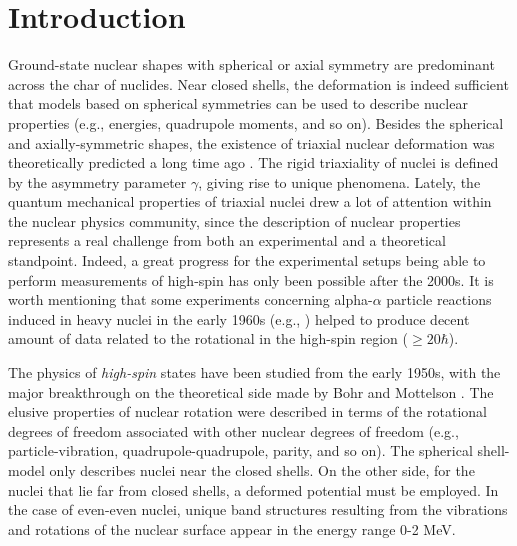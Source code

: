 \chapter{Introduction}

Ground-state nuclear shapes with spherical or axial symmetry are predominant across the char of nuclides. Near closed shells, the deformation is indeed sufficient that models based on spherical symmetries can be used to describe nuclear properties (e.g., energies, quadrupole moments, and so on). Besides the spherical and axially-symmetric shapes, the existence of triaxial nuclear deformation was theoretically predicted a long time ago \cite{bohr1998nuclear}. The rigid triaxiality of nuclei is defined by the asymmetry parameter $\gamma$, giving rise to unique phenomena. Lately, the quantum mechanical properties of triaxial nuclei drew a lot of attention within the nuclear physics community, since the description of nuclear properties represents a real challenge from both an experimental and a theoretical standpoint. Indeed, a great progress for the experimental setups being able to perform measurements of high-spin has only been possible after the 2000s. It is worth mentioning that some experiments concerning alpha-$\alpha$ particle reactions induced in heavy nuclei in the early 1960s (e.g., \cite{morinaga1963gamma}) helped to produce decent amount of data related to the rotational in the high-spin region ($\geq 20 \hbar$).

The physics of \emph{high-spin} states have been studied from the early 1950s, with the major breakthrough on the theoretical side made by Bohr and Mottelson \cite{bohr1998nuclear}. The elusive properties of nuclear rotation were described in terms of the rotational degrees of freedom associated with other nuclear degrees of freedom (e.g., particle-vibration, quadrupole-quadrupole, parity, and so on). The spherical shell-model only describes nuclei near the closed shells. On the other side, for the nuclei that lie far from closed shells, a deformed potential must be employed. In the case of even-even nuclei, unique band structures resulting from the vibrations and rotations of the nuclear surface appear in the energy range 0-2 MeV. 

